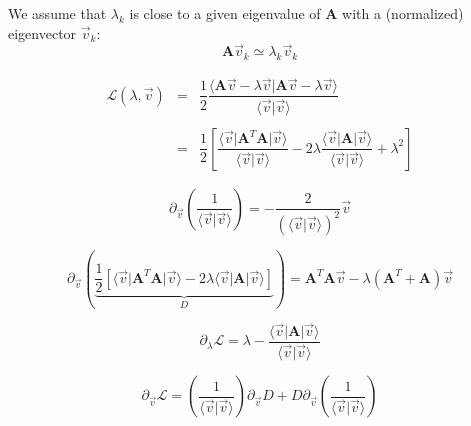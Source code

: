 \documentclass[aps,12pt]{revtex4}
\begin{document}
We assume that $\lambda_k$ is close to a given eigenvalue of $\bm{A}$ with a (normalized) eigenvector $\vec{v}_k$:
\begin{equation}
	\bm{A} \vec{v}_k \simeq \lambda_k \vec{v}_k
\end{equation}

\begin{equation}
\begin{array}{rcl}
	\mathcal{L}(\lambda,\vec{v}) & =  &
	\dfrac{1}{2}
	\dfrac{ 
	\langle \bm{A}\vec{v} - \lambda \vec{v} \vert \bm{A}\vec{v} - \lambda \vec{v}\rangle
	}
	{
	\langle \vec{v} \vert \vec{v} \rangle 
	}
	\\
	\\
	 & = & \dfrac{1}{2}\left\lbrack 
	 \dfrac{\langle \vec{v} \vert \bm{A}^T \bm{A} \vert \vec{v} \rangle}{\langle \vec{v} \vert \vec{v} \rangle }
	 -2 \lambda \dfrac{\langle \vec{v} \vert \bm{A} \vert \vec{v} \rangle }{\langle \vec{v} \vert \vec{v} \rangle }
	 +\lambda^2
	 \right\rbrack
\end{array}
\end{equation}

\begin{equation}
	\partial_{\vec{v}} \left( 
	\dfrac{1}{\langle \vec{v} \vert \vec{v} \rangle } 
	\right) = -\dfrac{2}{ \left(\langle \vec{v} \vert \vec{v} \rangle\right)^2 } \vec{v}
\end{equation}

\begin{equation}
	\partial_{\vec{v}} \left( \underbrace{\dfrac{1}{2} \left[ \langle \vec{v} \vert \bm{A}^T \bm{A} \vert \vec{v} \rangle - 2 \lambda \langle \vec{v} \vert \bm{A} \vert \vec{v} \rangle\right]}_{D} \right) =  \bm{A}^T \bm{A}   \vec{v} - \lambda \left( \bm{A}^T + \bm{A} \right) \vec{v}
\end{equation}

\begin{equation}
	\partial_\lambda \mathcal{L} = \lambda - \dfrac{\langle \vec{v} \vert \bm{A} \vert \vec{v} \rangle }{\langle \vec{v} \vert \vec{v} \rangle }
\end{equation}

\begin{equation}
\partial_{\vec{v}} \mathcal{L} = \left( 
	\dfrac{1}{\langle \vec{v} \vert \vec{v} \rangle } 
	\right) \partial_{\vec{v}} D + D \partial_{\vec{v}} \left( 
	\dfrac{1}{\langle \vec{v} \vert \vec{v} \rangle } 
	\right)
\end{equation}
\end{document}

